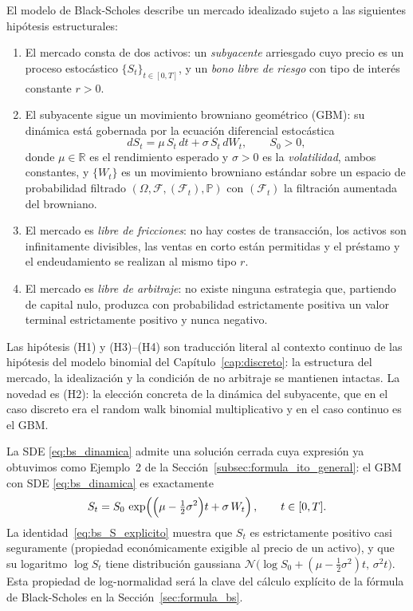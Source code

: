 \documentclass[11pt,a4paper,oneside]{report}
\theoremstyle{plain}
\theoremstyle{definition}
\theoremstyle{remark}
\newcommand{\R}{\mathbb{R}}
\newcommand{\PP}{\mathbb{P}}
\newcommand{\F}{\mathcal{F}}
\newcommand{\1}{\mathbf{1}}
\begin{document}
El modelo de Black-Scholes
describe un mercado idealizado sujeto a las siguientes
hipótesis estructurales:

\begin{enumerate}[label=\textnormal{(H\arabic*)}, leftmargin=*]
  \item El mercado consta de dos activos: un \emph{subyacente} arriesgado
        cuyo precio es un proceso estocástico $\{S_t\}_{t \in [0, T]}$,
        y un \emph{bono libre de riesgo} con tipo de interés constante
        $r > 0$.
  \item El subyacente sigue un movimiento browniano geométrico (GBM): su
        dinámica está gobernada por la ecuación diferencial estocástica
        \begin{equation}\label{eq:bs_dinamica}
          dS_t = \mu\, S_t\, dt + \sigma\, S_t\, dW_t,
          \qquad S_0 > 0,
        \end{equation}
        donde $\mu \in \R$ es el rendimiento esperado y $\sigma > 0$ es
        la \emph{volatilidad}, ambos constantes, y $\{W_t\}$ es un
        movimiento browniano estándar sobre un espacio de probabilidad
        filtrado $(\Omega, \F, (\F_t), \PP)$ con $(\F_t)$ la filtración
        aumentada del browniano.
  \item El mercado es \emph{libre de fricciones}: no hay costes de
        transacción, los activos son infinitamente divisibles, las
        ventas en corto están permitidas y el préstamo y el endeudamiento
        se realizan al mismo tipo $r$.
  \item El mercado es \emph{libre de arbitraje}: no existe ninguna
        estrategia que, partiendo de capital nulo, produzca con
        probabilidad estrictamente positiva un valor terminal estrictamente positivo y nunca negativo.
\end{enumerate}

Las hipótesis (H1) y (H3)–(H4) son traducción literal al contexto
continuo de las hipótesis del modelo binomial del
Capítulo~\ref{cap:discreto}: la estructura del mercado, la idealización
y la condición de no arbitraje se mantienen intactas. La novedad es (H2): la elección concreta de la dinámica del subyacente,
que en el caso discreto era el random walk binomial multiplicativo y
en el caso continuo es el GBM.

La SDE
\eqref{eq:bs_dinamica} admite una solución cerrada cuya expresión ya
obtuvimos como Ejemplo~2 de la
Sección~\ref{subsec:formula_ito_general}: el GBM con SDE
\eqref{eq:bs_dinamica} es exactamente
\begin{equation}\label{eq:bs_S_explicito}
  S_t = S_0\, \exp\!\left(\Bigl(\mu - \tfrac{1}{2}\sigma^2\Bigr) t
                          + \sigma\, W_t\right),
  \qquad t \in [0, T].
\end{equation}
La identidad~\eqref{eq:bs_S_explicito} muestra que $S_t$ es estrictamente positivo casi seguramente (propiedad económicamente exigible al
precio de un activo), y que su logaritmo $\log S_t$ tiene distribución
gaussiana $\mathcal{N}\bigl(\log S_0 + (\mu - \tfrac{1}{2}\sigma^2) t,\,
\sigma^2 t\bigr)$. Esta propiedad de log-normalidad será la
clave del cálculo explícito de la fórmula de Black-Scholes en la
Sección~\ref{sec:formula_bs}.
\end{document}
